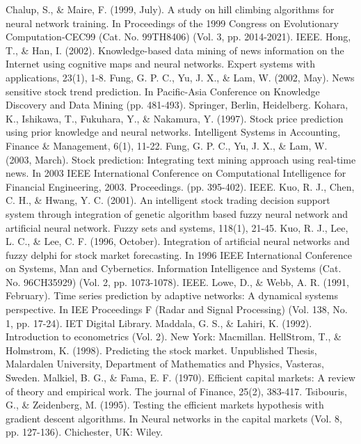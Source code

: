 \documentclass[a4paper,12pt]{report}
\begin{document}
\begin{thebibliography}{9}
	Chalup, S., \& Maire, F. (1999, July). A study on hill climbing algorithms for neural network training. In Proceedings of the 1999 Congress on Evolutionary Computation-CEC99 (Cat. No. 99TH8406) (Vol. 3, pp. 2014-2021). IEEE.
	Hong, T., \& Han, I. (2002). Knowledge-based data mining of news information on the Internet using cognitive maps and neural networks. Expert systems with applications, 23(1), 1-8.
	Fung, G. P. C., Yu, J. X., \& Lam, W. (2002, May). News sensitive stock trend prediction. In Pacific-Asia Conference on Knowledge Discovery and Data Mining (pp. 481-493). Springer, Berlin, Heidelberg.
	Kohara, K., Ishikawa, T., Fukuhara, Y., \& Nakamura, Y. (1997). Stock price prediction using prior knowledge and neural networks. Intelligent Systems in Accounting, Finance \& Management, 6(1), 11-22.
	Fung, G. P. C., Yu, J. X., \& Lam, W. (2003, March). Stock prediction: Integrating text mining approach using real-time news. In 2003 IEEE International Conference on Computational Intelligence for Financial Engineering, 2003. Proceedings. (pp. 395-402). IEEE.
	Kuo, R. J., Chen, C. H., \& Hwang, Y. C. (2001). An intelligent stock trading decision support system through integration of genetic algorithm based fuzzy neural network and artificial neural network. Fuzzy sets and systems, 118(1), 21-45.
	Kuo, R. J., Lee, L. C., \& Lee, C. F. (1996, October). Integration of artificial neural networks and fuzzy delphi for stock market forecasting. In 1996 IEEE International Conference on Systems, Man and Cybernetics. Information Intelligence and Systems (Cat. No. 96CH35929) (Vol. 2, pp. 1073-1078). IEEE.
	Lowe, D., \& Webb, A. R. (1991, February). Time series prediction by adaptive networks: A dynamical systems perspective. In IEE Proceedings F (Radar and Signal Processing) (Vol. 138, No. 1, pp. 17-24). IET Digital Library.
	Maddala, G. S., \& Lahiri, K. (1992). Introduction to econometrics (Vol. 2). New York: Macmillan.
	HellStrom, T., \& Holmstrom, K. (1998). Predicting the stock market. Unpublished Thesis, Malardalen University, Department of Mathematics and Physics, Vasteras, Sweden.
	Malkiel, B. G., \& Fama, E. F. (1970). Efficient capital markets: A review of theory and empirical work. The journal of Finance, 25(2), 383-417.
	Tsibouris, G., \& Zeidenberg, M. (1995). Testing the efficient markets hypothesis with gradient descent algorithms. In Neural networks in the capital markets (Vol. 8, pp. 127-136). Chichester, UK: Wiley.

\end{thebibliography}
\end{document}
